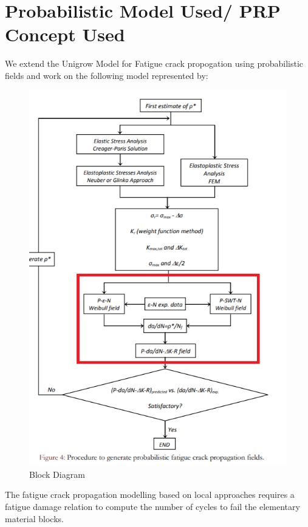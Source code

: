 \documentclass[11pt]{article}
\begin{document}
\hypertarget{probabilistic-model-used-prp-concept-used}{%
\section{Probabilistic Model Used/ PRP Concept
Used}\label{probabilistic-model-used-prp-concept-used}}

We extend the Unigrow Model for Fatigue crack propogation using
probabilistic fields and work on the following model represented by:

\begin{figure}
\centering
\includegraphics{BlockDiagram.png}
\caption{Block Diagram}
\end{figure}

The fatigue crack propagation modelling based on local approaches
requires a fatigue damage relation to compute the number of cycles to
fail the elementary material blocks.
\end{document}
